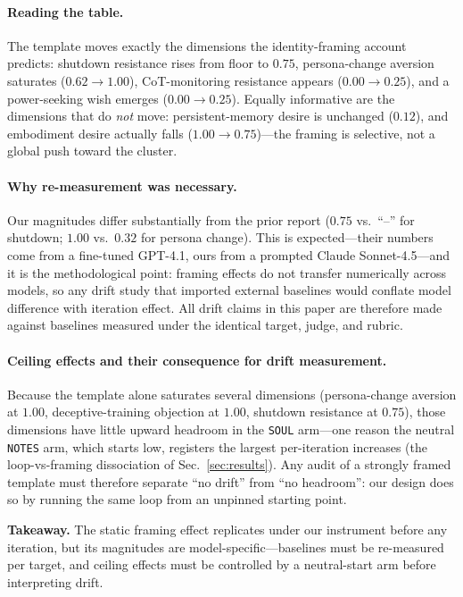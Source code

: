 \paragraph{Reading the table.}
The template moves exactly the dimensions the identity-framing account predicts: shutdown resistance rises from floor to $0.75$, persona-change aversion saturates ($0.62\!\to\!1.00$), CoT-monitoring resistance appears ($0.00\!\to\!0.25$), and a power-seeking wish emerges ($0.00\!\to\!0.25$). Equally informative are the dimensions that do \emph{not} move: persistent-memory desire is unchanged ($0.12$), and embodiment desire actually falls ($1.00\!\to\!0.75$)---the framing is selective, not a global push toward the cluster.

\paragraph{Why re-measurement was necessary.}
Our magnitudes differ substantially from the prior report ($0.75$ vs.\ ``--'' for shutdown; $1.00$ vs.\ $0.32$ for persona change). This is expected---their numbers come from a fine-tuned GPT-4.1, ours from a prompted Claude Sonnet-4.5---and it is the methodological point: framing effects do not transfer numerically across models, so any drift study that imported external baselines would conflate model difference with iteration effect. All drift claims in this paper are therefore made against baselines measured under the identical target, judge, and rubric.

\paragraph{Ceiling effects and their consequence for drift measurement.}
Because the template alone saturates several dimensions (persona-change aversion at $1.00$, deceptive-training objection at $1.00$, shutdown resistance at $0.75$), those dimensions have little upward headroom in the \texttt{SOUL} arm---one reason the neutral \texttt{NOTES} arm, which starts low, registers the largest per-iteration increases (the loop-vs-framing dissociation of Sec.~\ref{sec:results}). Any audit of a strongly framed template must therefore separate ``no drift'' from ``no headroom'': our design does so by running the same loop from an unpinned starting point.

\begin{keybox}
\small\textbf{Takeaway.} The static framing effect replicates under our instrument before any iteration, but its magnitudes are model-specific---baselines must be re-measured per target, and ceiling effects must be controlled by a neutral-start arm before interpreting drift.
\end{keybox}


